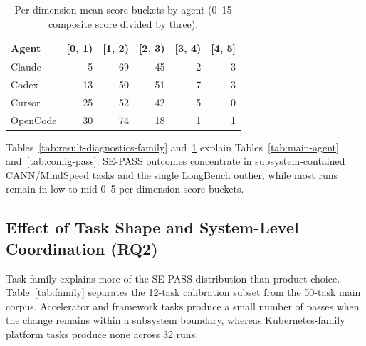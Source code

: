 \begin{table}[t]
\caption{Per-dimension mean-score buckets by agent (0--15 composite score divided by three).}
\label{tab:result-diagnostics-score}
\centering
\small
\begin{tabular*}{\columnwidth}{@{\extracolsep{\fill}}lrrrrr@{}}
\toprule
\textbf{Agent} & \textbf{[0, 1)} & \textbf{[1, 2)} & \textbf{[2, 3)} & \textbf{[3, 4)} & \textbf{[4, 5]} \\
\midrule
Claude   & 5  & 69 & 45 & 2 & 3 \\
Codex    & 13 & 50 & 51 & 7 & 3 \\
Cursor   & 25 & 52 & 42 & 5 & 0 \\
OpenCode & 30 & 74 & 18 & 1 & 1 \\
\bottomrule
\end{tabular*}
\end{table}

Tables~\ref{tab:result-diagnostics-family} and~\ref{tab:result-diagnostics-score} explain Tables~\ref{tab:main-agent} and~\ref{tab:config-pass}: SE-PASS outcomes concentrate in subsystem-contained CANN/MindSpeed tasks and the single LongBench outlier, while most runs remain in low-to-mid 0--5 per-dimension score buckets.


\subsection{Effect of Task Shape and System-Level Coordination (RQ2)}
\label{sec:results-family}

Task family explains more of the SE-PASS distribution than product choice. Table~\ref{tab:family} separates the 12-task calibration subset from the 50-task main corpus. Accelerator and framework tasks produce a small number of passes when the change remains within a subsystem boundary, whereas Kubernetes-family platform tasks produce none across 32 runs.

